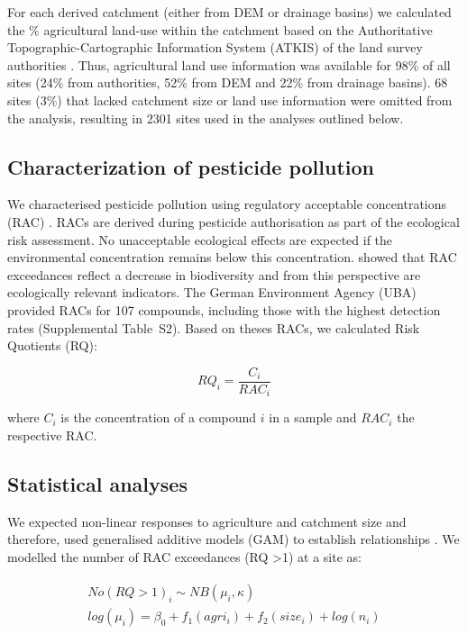 \documentclass[journal=esthag,manuscript=article]{achemso}
\begin{document}
For each derived catchment (either from DEM or drainage basins) we calculated the \% agricultural land-use within the catchment based on the Authoritative Topographic-Cartographic Information System (ATKIS) of the land survey authorities \citep{adv_atkis_2016}. 
Thus, agricultural land use information was available for 98\% of all sites (24\% from authorities, 52\% from DEM and 22\% from drainage basins). 
68 sites (3\%) that lacked catchment size or land use information were omitted from the analysis, resulting in 2301 sites used in the analyses outlined below.



\subsection{Characterization of pesticide pollution}
We characterised pesticide pollution using regulatory acceptable concentrations (RAC) \citep{brock_linking_2010}.
RACs are derived during pesticide authorisation as part of the ecological risk assessment.
No unacceptable ecological effects are expected if the environmental concentration remains below this concentration.
\citet{stehle_pesticide_2015} showed that RAC exceedances reflect a decrease in biodiversity and from this perspective are ecologically relevant indicators. 
The German Environment Agency (UBA) provided RACs for 107 compounds, including those with the highest detection rates (Supplemental Table~S2). 
Based on theses RACs, we calculated Risk Quotients (RQ):

\begin{equation}
RQ_i = \frac{C_i}{RAC_i}
\end{equation}

where $C_i$ is the concentration of a compound $i$ in a sample and $RAC_i$ the respective RAC.


\subsection{Statistical analyses}
We expected non-linear responses to agriculture and catchment size and therefore, used generalised additive models (GAM) to establish relationships \citep{fewster_analysis_2000}.
We modelled the number of RAC exceedances (RQ \textgreater 1) at a site as:

\begin{align}
\begin{split}
  No(RQ > 1)_i \sim NB(\mu_i, \kappa) \\
  log(\mu_i)= \beta_0 + f_1(agri_i) + f_2(size_i) + log(n_i) \\
\end{split}
\end{align}
\end{document}
